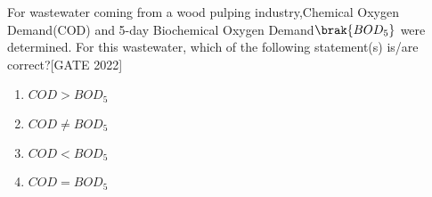 \item For wastewater coming from a wood pulping industry,Chemical Oxygen Demand(COD) and 5-day Biochemical Oxygen Demand$\brak{BO D_{5}}$ were determined. For this wastewater, which of the following statement(s) is/are correct?\hfill{[GATE 2022]}
\begin{multicols}{4}
\begin{enumerate}
\item $COD > BO D_{5}$
\item $COD \neq BO D_{5}$
\item $COD < BO D_{5}$ 
\item $COD = BO D_{5}$
\end{enumerate}
\end{multicols}


